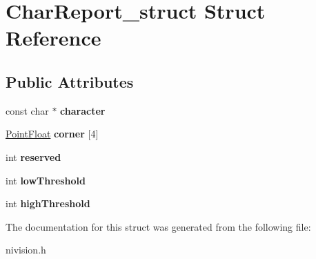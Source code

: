 \hypertarget{structCharReport__struct}{\section{\-Char\-Report\-\_\-struct \-Struct \-Reference}
\label{structCharReport__struct}
}
\subsection*{\-Public \-Attributes}
\begin{DoxyCompactItemize}
\item 
\hypertarget{structCharReport__struct_ab83798236c40fc49875a810bfa7d3a3f}{const char $\ast$ {\bfseries character}}\label{structCharReport__struct_ab83798236c40fc49875a810bfa7d3a3f}

\item 
\hypertarget{structCharReport__struct_a359ccc16cf1a666156aea955cc70fd12}{\hyperlink{structPointFloat__struct}{\-Point\-Float} {\bfseries corner} \mbox{[}4\mbox{]}}\label{structCharReport__struct_a359ccc16cf1a666156aea955cc70fd12}

\item 
\hypertarget{structCharReport__struct_a6c6645a4c360c6136f4f1e32f23e9c2f}{int {\bfseries reserved}}\label{structCharReport__struct_a6c6645a4c360c6136f4f1e32f23e9c2f}

\item 
\hypertarget{structCharReport__struct_a4155dbfcf49b01a5f3494631f359720c}{int {\bfseries low\-Threshold}}\label{structCharReport__struct_a4155dbfcf49b01a5f3494631f359720c}

\item 
\hypertarget{structCharReport__struct_ad50a77433299f11a944bfc029297ed33}{int {\bfseries high\-Threshold}}\label{structCharReport__struct_ad50a77433299f11a944bfc029297ed33}

\end{DoxyCompactItemize}


\-The documentation for this struct was generated from the following file\-:\begin{DoxyCompactItemize}
\item 
nivision.\-h\end{DoxyCompactItemize}
